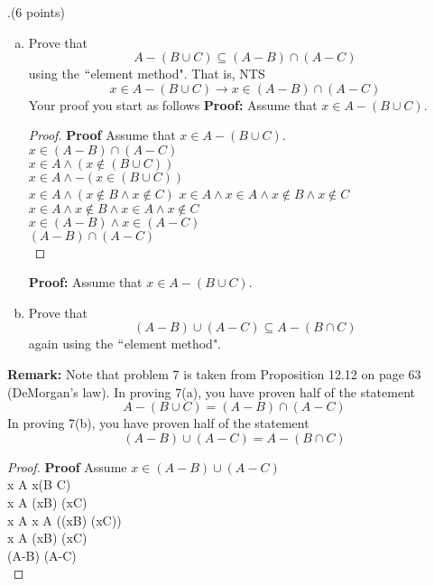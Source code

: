 \documentclass[12pt]{article}
\begin{document}
.(6 points) 
\begin{enumerate}[(a).]
    \item Prove that 
\[
A - (B \cup C) \subseteq (A -B) \cap (A - C)
\]
using the $``$element method".  That is, NTS
\[
x \in A - (B \cup C) \longrightarrow x \in (A - B) \cap (A - C)
\]
Your proof you start as follows
\vspace{.15in}
\noindent \textbf{Proof:} Assume that $x \in A - (B \cup C).$
\begin{proof}
\textbf{Proof} Assume that $x \in A - (B \cup C).$\\
\Rightarrow $ x \in (A-B) \cap (A-C)$ \\
\Rightarrow $ x \in A \wedge (x \notin (B \cup C))$\\
\Rightarrow $ x \in A \wedge -(x \in (B \cup C))$\\
\Rightarrow $ x \in A \wedge (x \notin B \wedge x \notin C)$
\Rightarrow $ x \in A \wedge x \in A \wedge x \notin B \wedge x \notin C$ \\
\Rightarrow $ x \in A \wedge x \notin B \wedge x \in A \wedge x \notin C$ \\
\Rightarrow $ x \in (A-B) \wedge x \in (A-C)$ \\
\Rightarrow $ (A-B) \cap (A-C)$ \\

\end{proof}






\noindent \textbf{Proof:} Assume that $x \in A - (B \cup C).$
\item Prove that 
\[
(A - B) \cup (A - C) \subseteq A - (B \cap C)
\]
again using the $``$element method".  
\end{enumerate}

\noindent \textbf{Remark:} Note that problem 7 is taken from Proposition 12.12 on page 63 (DeMorgan's law).  In proving 7(a), you have proven half of the statement 
\[
A - (B \cup C) =  (A -B) \cap (A - C)
\]
In proving 7(b), you have proven half of the statement 
\[
(A - B) \cup (A - C) = A - (B \cap C)
\]

\begin {proof}
\textbf{Proof } Assume $x \in (A-B) \cup (A-C)$\\
\Rightarrow x \in A \wedge x\notin (B \cap C) \\
\Rightarrow x \in A \wedge (x\notin B) \cup (x\notin C) \\
\Rightarrow x \in A \wedge x \in A \wedge ((x\notin B) \cup (x\notin C)) \\
\Rightarrow x \in A \wedge (x\notin B) \cup (x\notin C) \\
\Rightarrow (A-B) \cup (A-C)\\

\end{proof}
\end{document}
